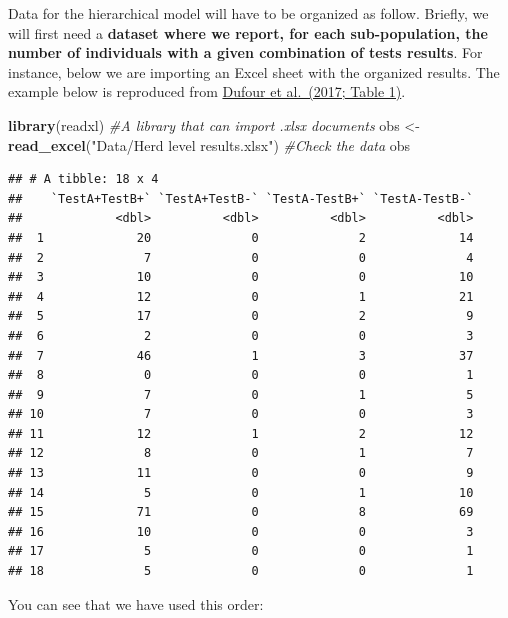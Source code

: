 \documentclass[
]{book}
\newenvironment{Shaded}{\begin{snugshade}}{\end{snugshade}}
\newcommand{\CommentTok}[1]{\textcolor[rgb]{0.56,0.35,0.01}{\textit{#1}}}
\newcommand{\FunctionTok}[1]{\textcolor[rgb]{0.13,0.29,0.53}{\textbf{#1}}}
\newcommand{\NormalTok}[1]{#1}
\newcommand{\OtherTok}[1]{\textcolor[rgb]{0.56,0.35,0.01}{#1}}
\newcommand{\StringTok}[1]{\textcolor[rgb]{0.31,0.60,0.02}{#1}}
\begin{document}
Data for the hierarchical model will have to be organized as follow. Briefly, we will first need a \textbf{dataset where we report, for each sub-population, the number of individuals with a given combination of tests results}. For instance, below we are importing an Excel sheet with the organized results. The example below is reproduced from \href{https://www.sciencedirect.com/science/article/pii/S016758771630527X?via\%3Dihub}{Dufour et al.~(2017; Table 1)}.

\begin{Shaded}
\begin{Highlighting}[]
\FunctionTok{library}\NormalTok{(readxl)   }\CommentTok{\#A library that can import .xlsx documents }
\NormalTok{obs }\OtherTok{\textless{}{-}} \FunctionTok{read\_excel}\NormalTok{(}\StringTok{"Data/Herd level results.xlsx"}\NormalTok{)}
\CommentTok{\#Check the data}
\NormalTok{obs}
\end{Highlighting}
\end{Shaded}

\begin{verbatim}
## # A tibble: 18 x 4
##    `TestA+TestB+` `TestA+TestB-` `TestA-TestB+` `TestA-TestB-`
##             <dbl>          <dbl>          <dbl>          <dbl>
##  1             20              0              2             14
##  2              7              0              0              4
##  3             10              0              0             10
##  4             12              0              1             21
##  5             17              0              2              9
##  6              2              0              0              3
##  7             46              1              3             37
##  8              0              0              0              1
##  9              7              0              1              5
## 10              7              0              0              3
## 11             12              1              2             12
## 12              8              0              1              7
## 13             11              0              0              9
## 14              5              0              1             10
## 15             71              0              8             69
## 16             10              0              0              3
## 17              5              0              0              1
## 18              5              0              0              1
\end{verbatim}

You can see that we have used this order:
\end{document}
